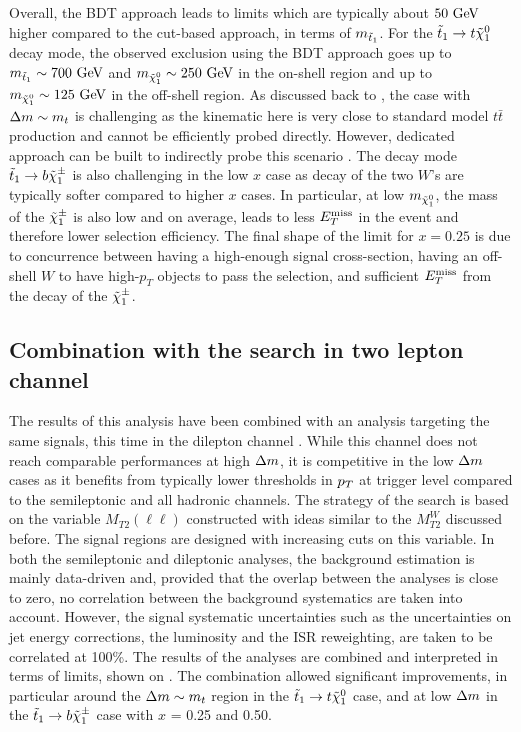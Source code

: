     Overall, the BDT approach leads to limits which are typically about $50~\text{GeV}$ higher
    compared to the cut-based approach, in terms of $m_{\tilde{t}_1}$. For the $\tilde{t}_1
    \rightarrow t \tilde{\chi}_1^0$ decay mode, the observed exclusion using the BDT approach
    goes up to $m_{\tilde{t}_1} \sim 700~\text{GeV}$ and $m_{\tilde{\chi}_1^0} \sim 250~\text{GeV}$ in the
    on-shell region and up to $m_{\tilde{\chi}_1^0} \sim 125~\text{GeV}$ in the off-shell region.
    As discussed back to , the case with $\Delta m \sim
    m_{t}$ is challenging as the kinematic here is very close to standard model $t\bar{t}$
    production and cannot be efficiently probed directly. However, dedicated approach can
    be built to indirectly probe this scenario \cite{SUS-13-021, ClosingStopGap}. The
    decay mode $\tilde{t}_1 \rightarrow b \tilde{\chi}_1^\pm$ is also challenging in the low $x$ case
    as decay of the two $W$'s are typically softer compared to higher $x$ cases. In
    particular, at low $m_{\tilde{\chi}_1^0}$, the mass of the $\tilde{\chi}_1^\pm$ is also low and
    on average, leads to less $E_T^\text{miss}$ in the event and therefore lower selection efficiency. The final shape
    of the limit for $x = 0.25$ is due to concurrence between having a high-enough signal cross-section,
    having an off-shell $W$ to have high-$p_T$ objects to pass the selection, and
    sufficient $E_T^\text{miss}$ from the decay of the $\tilde{\chi}_1^\pm$.

    \subsection{Combination with the search in two lepton channel}

    The results of this analysis have been combined with an analysis targeting the same
    signals, this time in the dilepton channel \cite{stopDilepton}. While this channel does not reach
    comparable performances at high $\Delta m$, it is competitive in the low $\Delta m$ cases
    as it benefits from typically lower thresholds in $p_T$ at trigger level compared to
    the semileptonic and all hadronic
    channels. The strategy of the search is based on the variable $M_{T2}(\ell\ell)$ constructed
    with ideas similar to the $M_{T2}^W$ discussed before. The signal regions are designed
    with increasing cuts on this variable. In both the semileptonic and dileptonic analyses,
    the background estimation is mainly data-driven and, provided that the overlap between
    the analyses is close to zero, no correlation between the background systematics are
    taken into account. However, the signal systematic uncertainties such as the uncertainties
    on jet energy corrections, the luminosity and the ISR reweighting, are taken to
    be correlated at 100\%. The results of the analyses are combined and interpreted
    in terms of limits, shown on . The combination allowed
    significant improvements, in particular around the $\Delta m \sim m_{t}$ region
    in the $\tilde{t}_1 \rightarrow t \tilde{\chi}_1^0$ case, and at low $\Delta m$ in the
    $\tilde{t}_1 \rightarrow b \tilde{\chi}_1^\pm$ case with $x$ = 0.25 and 0.50.

